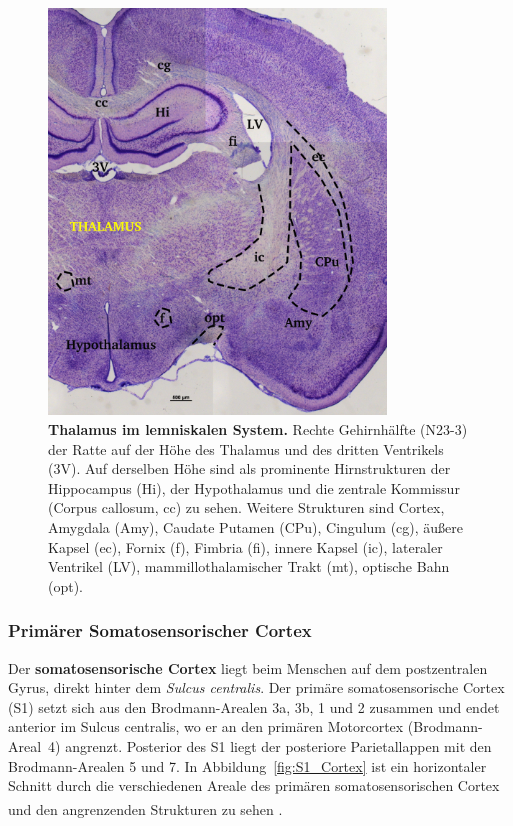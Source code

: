 \documentclass[12pt,a4paper,pdftex]{article}
\begin{document}
\begin{figure}[H]
    \centering
    \includegraphics[width = 0.8\textwidth]
    {pictures/somatosensory/thalamus_somato.png}
    \caption[Thalamus im lemniskalen System]{\textbf{Thalamus im lemniskalen System.} Rechte Gehirnhälfte (N23-3) der Ratte auf der Höhe des Thalamus und des dritten Ventrikels (3V). Auf derselben Höhe sind als prominente Hirnstrukturen der Hippocampus (Hi), der Hypothalamus und die zentrale Kommissur (Corpus callosum, cc) zu sehen. Weitere Strukturen sind Cortex, Amygdala (Amy), Caudate Putamen (CPu), Cingulum (cg), äußere Kapsel (ec), Fornix (f), Fimbria (fi), innere Kapsel (ic), lateraler Ventrikel (LV), mammillothalamischer Trakt (mt), optische Bahn (opt).}
    \label{fig:thalamus_somato}
\end{figure}

\subsubsection*{Primärer Somatosensorischer Cortex}
\label{subsubsec:S1}
Der \textbf{somatosensorische Cortex}  liegt beim Menschen auf dem postzentralen Gyrus, direkt hinter dem \textit{Sulcus centralis}. Der primäre somatosensorische Cortex (S1) setzt sich aus den Brodmann-Arealen 3a, 3b, 1 und 2 zusammen und endet anterior im Sulcus centralis, wo er an den primären Motorcortex (Brodmann-Areal~4) angrenzt. Posterior des S1 liegt der posteriore Parietallappen mit den Brodmann-Arealen 5 und 7. In Abbildung~\ref{fig:S1_Cortex} ist ein horizontaler Schnitt durch die verschiedenen Areale des primären somatosensorischen Cortex und den angrenzenden Strukturen zu sehen \textsuperscript{\cite[23]{kandel2013principles}}. 
\end{document}
